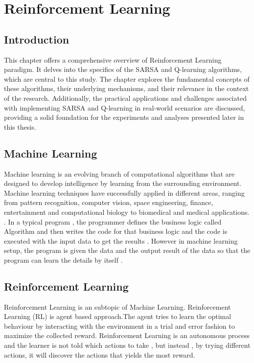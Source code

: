 \documentclass[a4paper,12pt]{Classes/RoboticsLaTeX}
\begin{document}
    \chapter{Reinforcement Learning }
	\label{chap:rl_algorithms}
 

     \section{Introduction} 
     This chapter offers a comprehensive overview of Reinforcement Learning paradigm. It delves into the specifics of the SARSA and Q-learning algorithms, which are central to this study. The chapter explores the fundamental concepts of these algorithms, their underlying mechanisms, and their relevance in the context of the research. Additionally, the practical applications and challenges associated with implementing SARSA and Q-learning in real-world scenarios are discussed, providing a solid foundation for the experiments and analyses presented later in this thesis.

    \section{Machine Learning} 
    
    Machine learning is an evolving branch of computational algorithms that are designed to develop intelligence by learning from the surrounding environment. Machine learning techniques have successfully applied in different areas, ranging from pattern recognition, computer vision, space engineering, finance, entertainment and computational biology to biomedical and medical applications. \cite{ElNaqa2015}.
    In a typical program , the programmer defines the business logic called Algorithm and then writes the code for that business logic and the code is executed with the input data to get the results .
    However in machine learning setup, the program  is given the data and the output result of the data so that  the program can learn the details by itself . \cite{alpaydin2021machine}
    
    \section{Reinforcement Learning} 
    
     Reinforcement Learning  is an subtopic of Machine Learning. Reinforcement Learning (RL) is agent based approach.The agent tries to learn the optimal behaviour by interacting with the environment in a trial and error fashion to maximize the collected reward. Reinforcement Learning is an autonomous process and the learner is not told which actions to take , but instead , by trying different actions, it will discover the actions that yields the most reward.
\end{document}
